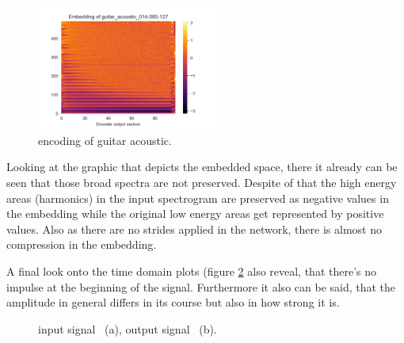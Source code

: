 \begin{figure}[htb!]
    \centering
    \includegraphics[width=0.55\textwidth]{images/results/emb_guitar_acoustic_014-060-127.png}
    \caption{encoding of guitar acoustic.}
    \label{fig:res_1D_emb}
\end{figure}

Looking at the graphic that depicts the embedded space, there it already can be seen that those broad spectra are not preserved. Despite of that the high energy areas (harmonics) in the input spectrogram are preserved as negative values in the embedding while the original low energy areas get represented by positive values. Also as there are no strides applied in the network, there is almost no compression in the embedding.

A final look onto the time domain plots (figure \ref{fig:res_1D_input_output_sig} also reveal, that there's no impulse at the beginning of the signal. Furthermore it also can be said, that the amplitude in general differs in its course but also in how strong it is.

\begin{figure}[htb!]
    \centering
    \caption{input signal ~(a), output signal ~(b).}
    \label{fig:res_1D_input_output_sig}
\end{figure}


